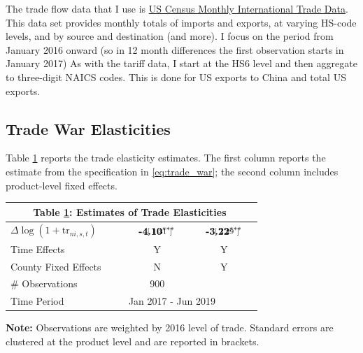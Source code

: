 \documentclass[pdftex,12pt]{article}
\renewcommand{\arraystretch}{.7}
\begin{document}
The trade flow data that I use is \href{https://www.census.gov/foreign-trade/data/index.html}{US Census Monthly International Trade Data}. This data set provides monthly totals of imports and exports, at varying HS-code levels, and by source and destination (and more). I focus on the period from January 2016 onward (so in 12 month differences the first observation starts in January 2017) As with the tariff data, I start at the HS6 level and then aggregate to three-digit NAICS codes. This is done for US exports to China and total US exports.

\subsection{Trade War Elasticities}

Table \ref{tb:war_rslts} reports the trade elasticity estimates. The first column reports the estimate from the specification in \ref{eq:trade_war}; the second column includes product-level fixed effects.

\begin{table}[!h]
\footnotesize
{}
\renewcommand{\arraystretch}{2.05}
\setlength {\tabcolsep}{3.5mm}
\begin{center}\label{tb:war_rslts}
\begin{tabular}{l c c}
\multicolumn{3}{c}{\normalsize \textbf{\ \ \ \ Table \ref{tb:war_rslts}: Estimates of Trade Elasticities \ \ \ \ }}\\
\hline
\hline
$\Delta \log\left(1+ \mbox{tr}_{ni,s,t} \right)$
& $\begin{array}{c}\textbf{-4.10}^{***} \vspace{-.45cm}\\ \scriptstyle \phantom{-}[ \ 1.31 \ ]\end{array}$
& $\begin{array}{c}\textbf{-3.22}^{***} \vspace{-.45cm}\\ \scriptstyle \phantom{-}[ \ 1.29 \ ]\end{array}$ \\
Time Effects            & Y & Y \\
County Fixed Effects    & N & Y \\
\hline
\# Observations &  900  \\
Time Period & \multicolumn{2}{l}{Jan 2017 - Jun 2019}\\
\hline
\end{tabular}
\parbox[c]{3.7in}{\vspace{.1cm}
{\footnotesize \textbf{Note:} Observations are weighted by 2016 level of trade. Standard errors are clustered at the product level and are reported in brackets.}}
\end{center}
\end{table}
\end{document}

